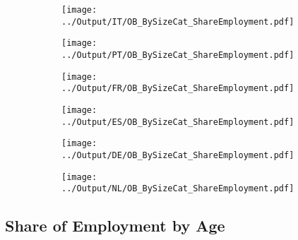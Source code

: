\documentclass[12pt,notitlepage]{article}
\begin{document}
\begin{figure}[!htpb]
\centering
\begin{subfigure}{.49\textwidth}
    \centering
 \texttt{[image: ../Output/IT/OB\_BySizeCat\_ShareEmployment.pdf]}
\end{subfigure}%
\begin{subfigure}{.49\textwidth}
    \centering
 \texttt{[image: ../Output/PT/OB\_BySizeCat\_ShareEmployment.pdf]}
\end{subfigure}
\begin{subfigure}{.49\textwidth}
    \centering
 \texttt{[image: ../Output/FR/OB\_BySizeCat\_ShareEmployment.pdf]}
\end{subfigure}%
\begin{subfigure}{.49\textwidth}
    \centering
 \texttt{[image: ../Output/ES/OB\_BySizeCat\_ShareEmployment.pdf]}
\end{subfigure}
\begin{subfigure}{.49\textwidth}
    \centering
 \texttt{[image: ../Output/DE/OB\_BySizeCat\_ShareEmployment.pdf]}
\end{subfigure}
\begin{subfigure}{.49\textwidth}
    \centering
 \texttt{[image: ../Output/NL/OB\_BySizeCat\_ShareEmployment.pdf]}
\end{subfigure}
\end{figure}
\clearpage



\subsection{Share of Employment by Age}
\end{document}
